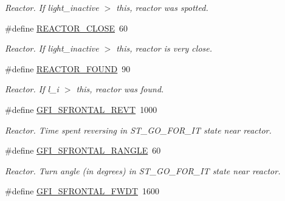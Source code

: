 \begin{DoxyCompactItemize}
\begin{DoxyCompactList}\small\item\em Reactor. If light\_\-inactive $>$ this, reactor was spotted. \item\end{DoxyCompactList}\item 
\hypertarget{reactor_8nxc_a900c7579f499cdcaf00704ae6598036a}{
\#define \hyperlink{reactor_8nxc_a900c7579f499cdcaf00704ae6598036a}{REACTOR\_\-CLOSE}~60}
\label{reactor_8nxc_a900c7579f499cdcaf00704ae6598036a}

\begin{DoxyCompactList}\small\item\em Reactor. If light\_\-inactive $>$ this, reactor is very close. \item\end{DoxyCompactList}\item 
\hypertarget{reactor_8nxc_a05ff785034efa7b287ee834f9ccb74f1}{
\#define \hyperlink{reactor_8nxc_a05ff785034efa7b287ee834f9ccb74f1}{REACTOR\_\-FOUND}~90}
\label{reactor_8nxc_a05ff785034efa7b287ee834f9ccb74f1}

\begin{DoxyCompactList}\small\item\em Reactor. If l\_\-i $>$ this, reactor was found. \item\end{DoxyCompactList}\item 
\hypertarget{reactor_8nxc_ae981e3a47c44d4878baa7c830f5b846a}{
\#define \hyperlink{reactor_8nxc_ae981e3a47c44d4878baa7c830f5b846a}{GFI\_\-SFRONTAL\_\-REVT}~1000}
\label{reactor_8nxc_ae981e3a47c44d4878baa7c830f5b846a}

\begin{DoxyCompactList}\small\item\em Reactor. Time spent reversing in ST\_\-GO\_\-FOR\_\-IT state near reactor. \item\end{DoxyCompactList}\item 
\hypertarget{reactor_8nxc_ae6cb54a3555702c9db09d084dba51143}{
\#define \hyperlink{reactor_8nxc_ae6cb54a3555702c9db09d084dba51143}{GFI\_\-SFRONTAL\_\-RANGLE}~60}
\label{reactor_8nxc_ae6cb54a3555702c9db09d084dba51143}

\begin{DoxyCompactList}\small\item\em Reactor. Turn angle (in degrees) in ST\_\-GO\_\-FOR\_\-IT state near reactor. \item\end{DoxyCompactList}\item 
\hypertarget{reactor_8nxc_adee1b3613cfe237cecaba8f2d6f8ecdc}{
\#define \hyperlink{reactor_8nxc_adee1b3613cfe237cecaba8f2d6f8ecdc}{GFI\_\-SFRONTAL\_\-FWDT}~1600}
\label{reactor_8nxc_adee1b3613cfe237cecaba8f2d6f8ecdc}


\end{DoxyCompactItemize}
